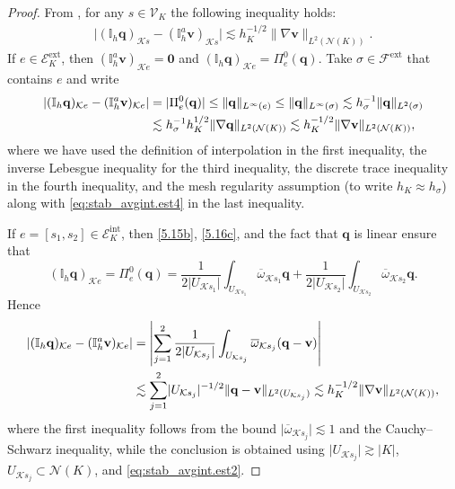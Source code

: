 \documentclass[a4paper,11pt]{article}
\theoremstyle{definition}
\theoremstyle{remark}
\newcommand{\bo}[1]{\mathbf{#1}}
\newcommand{\mI}[1]{\mathbb I_h\bo{#1}}
\newcommand{\aI}[1]{\mathbb I^{a}_h\bo{#1}}
\def\ext{\text{ext}}
\def\inte{\text{int}}
\def\cE{\mathcal{E}}
\def\cF{\mathcal{F}}
\def\cK{\mathcal{K}}
\def\cN{\mathcal{N}}
\def\cV{\mathcal{V}}
\begin{document}
\begin{proof}
From \cite[Proposition 5.5]{pjddr}, for any $s\in\cV_K$ the following inequality holds:
\begin{align}\label{eq:stab_avgint.est6}
\lvert (\mI{q})_{\cK s}-(\aI{v})_{\cK s}\rvert\lesssim h^{-1/2}_K\lVert\nabla\bo{v}\rVert_{L^2(\cN(K))}.
\end{align}
If $e\in\cE^{\ext}_K$, then $(\aI{v})_{\cK e}=\bo{0}$ and $(\mI{q})_{\cK e}=\Pi^0_e(\bo{q})$. Take $\sigma\in\cF^\ext$ that contains $e$ and write
\begin{align*}
\lvert (\mI{q})_{\cK e}-(\aI{v})_{\cK e}\rvert&=\lvert \Pi^0_e(\bo{q})\rvert\leq \lVert \bo{q}\rVert_{L^\infty(e)}\leq \lVert \bo{q}\rVert_{L^\infty(\sigma)}\lesssim h^{-1}_\sigma\lVert \bo{q}\rVert_{L^2(\sigma)}\notag\\
&\lesssim h^{-1}_\sigma h^{1/2}_K\lVert \nabla \bo{q}\rVert_{L^2(\cN(K))}\lesssim h^{-1/2}_K\lVert \nabla \bo{v}\rVert_{L^2(\cN(K))},
\end{align*}
where we have used the definition of interpolation in the first inequality, the inverse Lebesgue inequality \cite[Lemma 1.25]{hho-book} for the third inequality, the discrete trace inequality \cite[Lemma 1.32]{hho-book} in the fourth inequality, and the mesh regularity assumption (to write $h_K\approx h_\sigma$) along with \eqref{eq:stab_avgint.est4} in the last inequality.

If $e=[s_1,s_2]\in \cE^\inte_K$, then \eqref{5.15b}, \eqref{5.16c}, and the fact that $\bo{q}$ is linear ensure that
\begin{equation*}
(\mI{q})_{\cK e}=\Pi^0_e(\bo{q})=\frac{1}{2\lvert U_{\mathcal K s_1}\rvert}\int_{U_{\mathcal K s_1}}\overline{\omega}_{\mathcal Ks_1}\bo{q}+\frac{1}{2\lvert U_{\mathcal K s_2}\rvert}\int_{U_{\mathcal K s_2}}\overline{\omega}_{\mathcal Ks_2}\bo{q}.
\end{equation*}
Hence
\begin{align*}
\lvert (\mI{q})_{\cK e}-(\aI{v})_{\cK e}\rvert&=\left\vert\sum_{j=1}^2 \frac{1}{2\lvert U_{\cK s_j}\rvert}\int_{U_{\cK s_j}}\overline{\omega}_{\cK s_j}(\bo{q}-\bo{v})\right\vert\notag\\
&\lesssim\sum_{j=1}^2\lvert U_{\cK s_j}\rvert^{-1/2}\lVert \bo{q}-\bo{v}\rVert_{L^2(U_{\cK s_j})}\lesssim h^{-1/2}_K\lVert\nabla \bo{v}\rVert_{L^2(\cN (K))},
\end{align*}
where the first inequality follows from the bound $\lvert \overline{\omega}_{\cK s_j}\rvert\lesssim 1$ and the Cauchy–Schwarz inequality, while the conclusion is obtained using $\lvert U_{\cK s_j}\rvert \gtrsim \lvert K\rvert$, $U_{\cK s_j}\subset \cN(K)$, and \eqref{eq:stab_avgint.est2}.


\end{proof}
\end{document}

